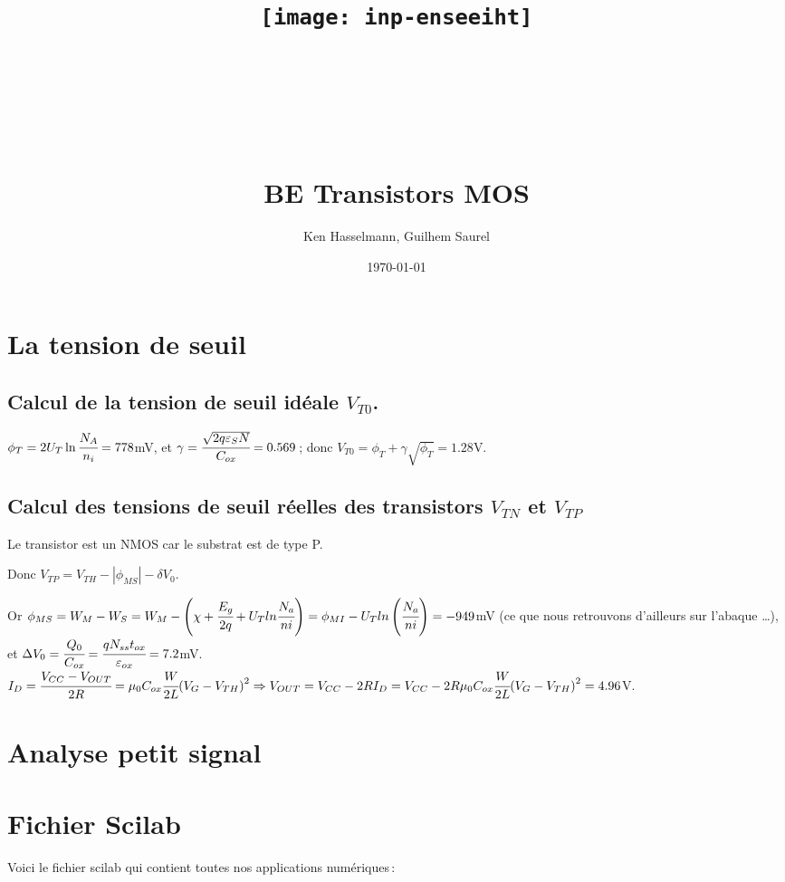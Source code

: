 \documentclass[10pt]{article}
\title{\texttt{[image: inp-enseeiht]} \\ ~ \\ ~ \\ ~ \\ ~ \\ BE Transistors MOS}
\author{Ken Hasselmann, Guilhem Saurel}
\date{\today}
\begin{document}
 \begin{titlepage}
  \maketitle
  \tableofcontents
 \end{titlepage}

 \section{La tension de seuil}
  \subsection{Calcul de la tension de seuil idéale $V_{T0}$.}
   $\phi_T = 2 U_T \ln\cfrac{N_A}{n_i} = 778$mV,
   et $\gamma = \cfrac{\sqrt{2q\varepsilon_SN}}{C_{ox}} = 0.569$\,;
   donc $V_{T0} = \phi_T + \gamma\sqrt{\phi_T} = 1.28$V.

  \subsection{Calcul des tensions de seuil réelles des transistors $V_{TN}$ et $V_{TP}$}
   Le transistor est un NMOS car le substrat est de type P.
   
   Donc  $V_{TP} = V_{TH} - |\phi_{MS}| - \delta{V_0}$. %

   
   Or $\phi_{MS} = W_M - W_S = W_M - \left(\chi + \cfrac{E_g}{2q} + U_T ln \cfrac{N_a}{ni} \right) = \phi_{MI} - U_T ln \left(\cfrac{N_a}{ni}\right) = -949$mV (ce que nous retrouvons d’ailleurs sur l’abaque …),
   et $\Delta V_0 = \cfrac{Q_0}{C_{ox}} = \cfrac{q N_{ss} t_{ox}}{\varepsilon_{ox}} = 7.2$mV.
$I_D = \cfrac{V_{CC} - V_{OUT}}{2 R} = \mu_0 C_{ox} \cfrac{W}{2L}{\left(V_G - V_{TH}\right)}^2 \Rightarrow
 V_{OUT} = V_{CC} - 2 R I_D = V_{CC} - 2 R \mu_0 C_{ox} \cfrac{W}{2L}{\left(V_G - V_{TH}\right)}^2 = 4.96$V.
 
 \section{Analyse petit signal}

 \appendix
 \section{Fichier Scilab}
 Voici le fichier scilab qui contient toutes nos applications numériques\,:
 
 \inputminted[linenos]{matlab}{scilab.sci}
\end{document}
